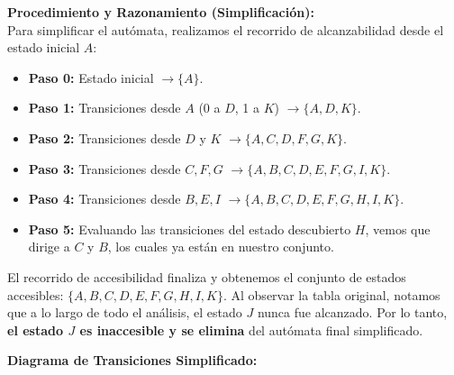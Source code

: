 \documentclass[12pt]{article}
\begin{document}
\vspace{0.5cm}

\textbf{Procedimiento y Razonamiento (Simplificación):} \\
Para simplificar el autómata, realizamos el recorrido de alcanzabilidad desde el estado inicial $A$:
\begin{itemize}
    \item \textbf{Paso 0:} Estado inicial $\rightarrow \{A\}$.
    \item \textbf{Paso 1:} Transiciones desde $A$ (0 a $D$, 1 a $K$) $\rightarrow \{A, D, K\}$.
    \item \textbf{Paso 2:} Transiciones desde $D$ y $K$ $\rightarrow \{A, C, D, F, G, K\}$.
    \item \textbf{Paso 3:} Transiciones desde $C, F, G$ $\rightarrow \{A, B, C, D, E, F, G, I, K\}$.
    \item \textbf{Paso 4:} Transiciones desde $B, E, I$ $\rightarrow \{A, B, C, D, E, F, G, H, I, K\}$.
    \item \textbf{Paso 5:} Evaluando las transiciones del estado descubierto $H$, vemos que dirige a $C$ y $B$, los cuales ya están en nuestro conjunto.
\end{itemize}
El recorrido de accesibilidad finaliza y obtenemos el conjunto de estados accesibles: $\{A, B, C, D, E, F, G, H, I, K\}$.
Al observar la tabla original, notamos que a lo largo de todo el análisis, el estado $J$ nunca fue alcanzado. Por lo tanto, \textbf{el estado $J$ es inaccesible y se elimina} del autómata final simplificado.

\vspace{0.5cm}

\textbf{Diagrama de Transiciones Simplificado:}
\end{document}
